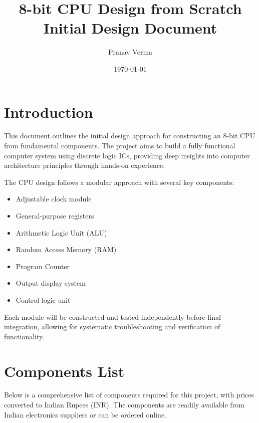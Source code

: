 \documentclass[a4paper,12pt]{article}
\title{\Huge 8-bit CPU Design from Scratch\\
\Large Initial Design Document}
\author{Pranav Verma}
\date{\today}
\begin{document}
\maketitle
\tableofcontents
\newpage

\section{Introduction}

This document outlines the initial design approach for constructing an 8-bit CPU from fundamental components. The project aims to build a fully functional computer system using discrete logic ICs, providing deep insights into computer architecture principles through hands-on experience.

The CPU design follows a modular approach with several key components:
\begin{itemize}
    \item Adjustable clock module
    \item General-purpose registers
    \item Arithmetic Logic Unit (ALU)
    \item Random Access Memory (RAM)
    \item Program Counter
    \item Output display system
    \item Control logic unit
\end{itemize}

Each module will be constructed and tested independently before final integration, allowing for systematic troubleshooting and verification of functionality.

\section{Components List}

Below is a comprehensive list of components required for this project, with prices converted to Indian Rupees (INR). The components are readily available from Indian electronics suppliers or can be ordered online.
\end{document}
